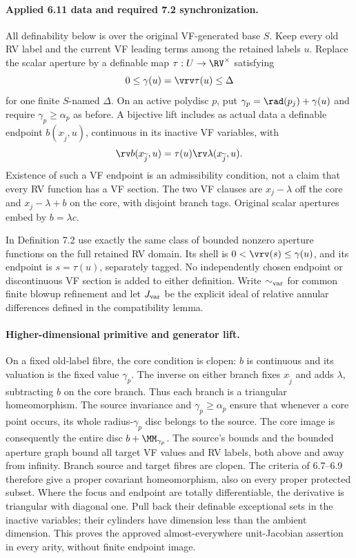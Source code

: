 
\paragraph{Applied 6.11 data and required 7.2 synchronization.}
All definability below is over the original VF-generated base $S$.
Keep every old RV label and the current VF leading terms among the
retained labels $u$. Replace the scalar aperture by a definable map
$\tau:U\to\RV^\times$ satisfying
\[
 0\leq\gamma(u)=\vrv\tau(u)\leq\Delta
\]
for one finite $S$-named $\Delta$. On an active polydisc $p$, put
$\gamma_p=\rad(p_j)+\gamma(u)$ and require
$\gamma_p\geq\alpha_p$ as before. A bijective lift includes as actual
data a definable endpoint $b(x_{\widetilde j},u)$, continuous in its
inactive VF variables, with
\[
 \rv b(x_{\widetilde j},u)=\tau(u)\rv\lambda(x_{\widetilde j},u).
\]
Existence of such a VF endpoint is an admissibility condition, not a
claim that every RV function has a VF section. The two VF clauses are
$x_j-\lambda$ off the core and $x_j-\lambda+b$ on the core, with disjoint
branch tags. Original scalar apertures embed by $b=\lambda c$.

In Definition 7.2 use exactly the same class of bounded nonzero aperture
functions on the full retained RV domain. Its shell is
$0<\vrv(s)\leq\gamma(u)$, and its endpoint is $s=\tau(u)$, separately
tagged. No independently chosen endpoint or discontinuous VF section
is added to either definition. Write $\sim_{\rm var}$ for common finite
blowup refinement and let $J_{\rm var}$ be the explicit ideal of relative
annular differences defined in the compatibility lemma.

\paragraph{Higher-dimensional primitive and generator lift.}
On a fixed old-label fibre, the core condition is clopen: $b$ is
continuous and its valuation is the fixed value $\gamma_p$. The inverse
on either branch fixes $x_{\widetilde j}$ and adds $\lambda$, subtracting
$b$ on the core branch. Thus each branch is a triangular homeomorphism.
The source invariance and $\gamma_p\geq\alpha_p$ ensure that whenever a
core point occurs, its whole radius-$\gamma_p$ disc belongs to the
source. The core image is consequently the entire disc $b+\MM_{\gamma_p}$.
The source's bounds and the bounded aperture graph bound all target VF
values and RV labels, both above and away from infinity. Branch source
and target fibres are clopen. The criteria of 6.7--6.9 therefore give a
proper covariant homeomorphism, also on every proper protected subset.
Where the focus and endpoint are totally differentiable, the derivative
is triangular with diagonal one. Pull back their definable exceptional
sets in the inactive variables; their cylinders have dimension less
than the ambient dimension. This proves the approved almost-everywhere
unit-Jacobian assertion in every arity, without finite endpoint image.

